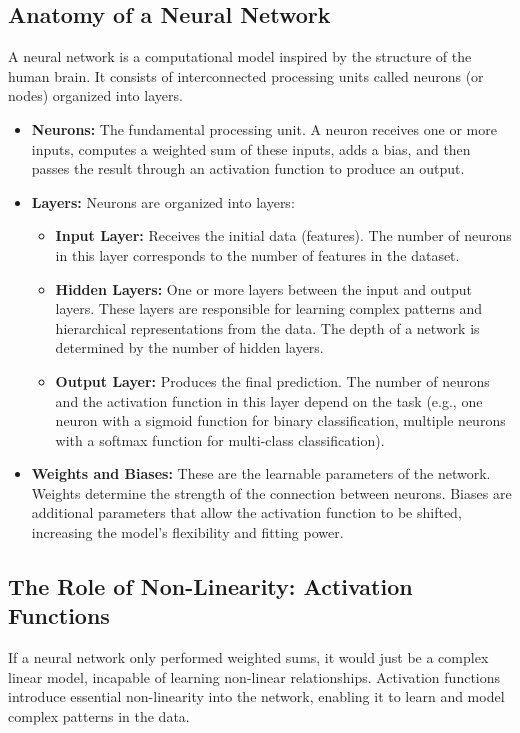 \documentclass[11pt,a4paper]{article}
\begin{document}
\subsection{Anatomy of a Neural Network}

A neural network is a computational model inspired by the structure of the human brain. It consists of interconnected processing units called neurons (or nodes) organized into layers.

\begin{itemize}
    \item \textbf{Neurons:} The fundamental processing unit. A neuron receives one or more inputs, computes a weighted sum of these inputs, adds a bias, and then passes the result through an activation function to produce an output.
    \item \textbf{Layers:} Neurons are organized into layers:
    \begin{itemize}
        \item \textbf{Input Layer:} Receives the initial data (features). The number of neurons in this layer corresponds to the number of features in the dataset.
        \item \textbf{Hidden Layers:} One or more layers between the input and output layers. These layers are responsible for learning complex patterns and hierarchical representations from the data. The depth of a network is determined by the number of hidden layers.
        \item \textbf{Output Layer:} Produces the final prediction. The number of neurons and the activation function in this layer depend on the task (e.g., one neuron with a sigmoid function for binary classification, multiple neurons with a softmax function for multi-class classification).
    \end{itemize}
    \item \textbf{Weights and Biases:} These are the learnable parameters of the network. Weights determine the strength of the connection between neurons. Biases are additional parameters that allow the activation function to be shifted, increasing the model's flexibility and fitting power.
\end{itemize}

\subsection{The Role of Non-Linearity: Activation Functions}

If a neural network only performed weighted sums, it would just be a complex linear model, incapable of learning non-linear relationships. Activation functions introduce essential non-linearity into the network, enabling it to learn and model complex patterns in the data.
\end{document}

